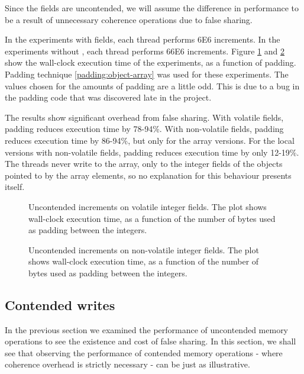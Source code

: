Since the fields are uncontended, we will assume the difference in performance
to be a result of unnecessary coherence operations due to false sharing.

In the experiments with  fields, each thread performs 6E6
increments.
In the experiments without , each thread performs 66E6 increments.
Figure \ref{fig:uncont} and \ref{fig:uncont-nob} show the wall-clock execution
time of the experiments, as a function of padding. Padding technique
\ref{padding:object-array} was used for these experiments. The values chosen for
the amounts of padding are a little odd. This is due to a bug in the padding
code that was discovered late in the project.

The results show significant overhead from false sharing. With volatile
fields, padding reduces execution time by  78-94\%.
With non-volatile fields, padding reduces execution time by 86-94\%, but only
for the array versions. For the local versions with non-volatile fields, padding
reduces execution time by only 12-19\%. The threads never write to the array,
only to the integer fields of the objects pointed to by the array elements, so
no explanation for this behaviour presents itself.

\begin{figure}[hbpt]
\graphicspath{{plots/}}

\caption{Uncontended increments on volatile integer fields. The plot shows wall-clock
	execution time, as a function of the number of bytes used as padding
	between the integers.}
	\label{fig:uncont}
\end{figure}

\begin{figure}[hbpt]
\graphicspath{{plots/}}

\caption{Uncontended increments on non-volatile integer fields. The plot shows
	wall-clock execution time, as a function of the number of bytes used as padding
	between the integers.}
\label{fig:uncont-nob}
\end{figure}

\subsection{Contended writes}

In the previous section we examined the performance of uncontended memory
operations to see the existence and cost of false sharing. In this section, we
shall see that observing the performance of contended memory operations - where
coherence overhead is strictly necessary - can be just as illustrative.

